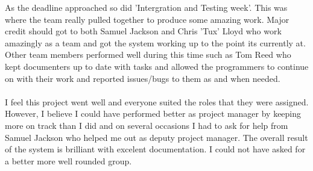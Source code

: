 \documentclass{project}
\begin{document}
As the deadline approached so did 'Intergration and Testing week'. This was where the team really pulled together to produce some amazing work. Major credit should got to both Samuel Jackson and Chris 'Tux' Lloyd who work amazingly as a team and got the system working up to the point its currently at. Other team members performed well during this time such as Tom Reed who kept documenters up to date with tasks and allowed the programmers to continue on with their work and reported issues/bugs to them as and when needed.
\\\\
I feel this project went well and everyone suited the roles that they were assigned. However, I believe I could have performed better as project manager by keeping more on track than I did and on several occasions I had to ask for help from Samuel Jackson who helped me out as deputy project manager. The overall result of the system is brilliant with excelent documentation. I could not have asked for a better more well rounded group.
\end{document}
